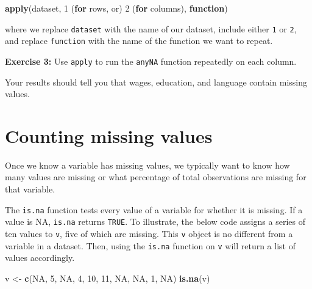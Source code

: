 \documentclass[
]{book}
\newenvironment{Shaded}{\begin{snugshade}}{\end{snugshade}}
\newcommand{\ControlFlowTok}[1]{\textcolor[rgb]{0.13,0.29,0.53}{\textbf{#1}}}
\newcommand{\DecValTok}[1]{\textcolor[rgb]{0.00,0.00,0.81}{#1}}
\newcommand{\KeywordTok}[1]{\textcolor[rgb]{0.13,0.29,0.53}{\textbf{#1}}}
\newcommand{\NormalTok}[1]{#1}
\newcommand{\OtherTok}[1]{\textcolor[rgb]{0.56,0.35,0.01}{#1}}
\newcommand{\StringTok}[1]{\textcolor[rgb]{0.31,0.60,0.02}{#1}}
\newenvironment{learncheck}%
{%
  \par\vspace{\baselineskip}\noindent 
  \color{Exercise}\begin{itshape}%
  \par\vspace{\baselineskip}\noindent\ignorespaces 
}%
{%
  \end{itshape}\ignorespacesafterend 
}
\begin{document}
\begin{Shaded}
\begin{Highlighting}[]
\KeywordTok{apply}\NormalTok{(dataset, }\DecValTok{1}\NormalTok{ (}\ControlFlowTok{for}\NormalTok{ rows, or) }\DecValTok{2}\NormalTok{ (}\ControlFlowTok{for}\NormalTok{ columns), }\ControlFlowTok{function}\NormalTok{)}
\end{Highlighting}
\end{Shaded}

where we replace \texttt{dataset} with the name of our dataset, include either \texttt{1} or \texttt{2}, and replace \texttt{function} with the name of the function we want to repeat.

\begin{learncheck}
\textbf{Exercise 3:} Use \texttt{apply} to run the \texttt{anyNA}
function repeatedly on each column.
\end{learncheck}

Your results should tell you that wages, education, and language contain missing values.

\hypertarget{counting-missing-values}{%
\section{Counting missing values}\label{counting-missing-values}}

Once we know a variable has missing values, we typically want to know how many values are missing or what percentage of total observations are missing for that variable.

The \texttt{is.na} function tests every value of a variable for whether it is missing. If a value is NA, \texttt{is.na} returns \texttt{TRUE}. To illustrate, the below code assigns a series of ten values to \texttt{v}, five of which are missing. This \texttt{v} object is no different from a variable in a dataset. Then, using the \texttt{is.na} function on \texttt{v} will return a list of values accordingly.

\begin{Shaded}
\begin{Highlighting}[]
\NormalTok{v <-}\StringTok{ }\KeywordTok{c}\NormalTok{(}\OtherTok{NA}\NormalTok{, }\DecValTok{5}\NormalTok{, }\OtherTok{NA}\NormalTok{, }\DecValTok{4}\NormalTok{, }\DecValTok{10}\NormalTok{, }\DecValTok{11}\NormalTok{, }\OtherTok{NA}\NormalTok{, }\OtherTok{NA}\NormalTok{, }\DecValTok{1}\NormalTok{, }\OtherTok{NA}\NormalTok{)}
\KeywordTok{is.na}\NormalTok{(v)}
\end{Highlighting}
\end{Shaded}
\end{document}
